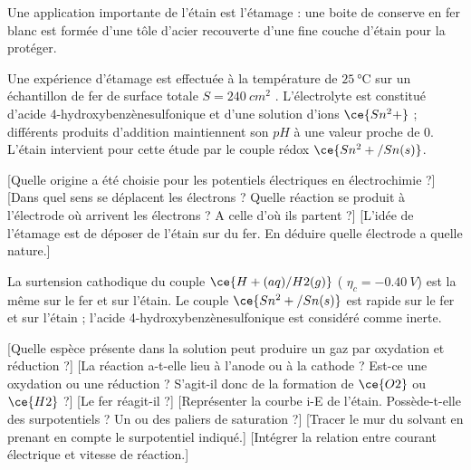     \begin{figure}[!ht]
      \centering
      
    \end{figure}
    
    Une application importante de l'étain est l’étamage : une boite de conserve en fer blanc est formée d’une tôle d’acier recouverte d’une fine couche d’étain pour la protéger.
    
    Une expérience d’étamage est effectuée à la température de $\SI{25}{\celsius}$ sur un échantillon de fer de surface totale $S = \SI{240}{cm^2}$ . L’électrolyte est constitué d’acide 4-hydroxybenzènesulfonique et d’une solution d’ions $\ce{Sn^2+}$ ; différents produits d’addition maintiennent son $pH$ à une valeur proche de $0$. L’étain intervient pour cette étude par le couple rédox $\ce{Sn^2+ /Sn(s)}$.

    \begin{enumerate}
        [Quelle origine a été choisie pour les potentiels électriques en électrochimie ?]
        [Dans quel sens se déplacent les électrons ? Quelle réaction se produit à l'électrode où arrivent les électrons ? A celle d'où ils partent ?]
        [L'idée de l'étamage est de déposer de l'étain sur du fer. En déduire quelle électrode a quelle nature.]
    \end{enumerate}
   
    
    La surtension cathodique du couple $\ce{H+ (aq)/H2 (g)}$ ( $\eta_c = -\SI{0,40}{V}$) est la même sur le fer et sur l’étain. Le couple $\ce{Sn^2+ /Sn(s)}$ est rapide sur le fer et sur l’étain ; l’acide 4-hydroxybenzènesulfonique est considéré comme inerte.
    \begin{enumerate}
      \setcounter{enumi}{2}
        [Quelle espèce présente dans la solution peut produire un gaz par oxydation et réduction ?]
        [La réaction a-t-elle lieu à l'anode ou à la cathode ? Est-ce une oxydation ou une réduction ? S'agit-il donc de la formation de $\ce{O2}$ ou $\ce{H2}$ ?]
        [Le fer réagit-il ?]
        [Représenter la courbe i-E de l'étain. Possède-t-elle des surpotentiels ? Un ou des paliers de saturation ?]
        [Tracer le mur du solvant en prenant en compte le surpotentiel indiqué.]
        [Intégrer la relation entre courant électrique et vitesse de réaction.]
    \end{enumerate}

